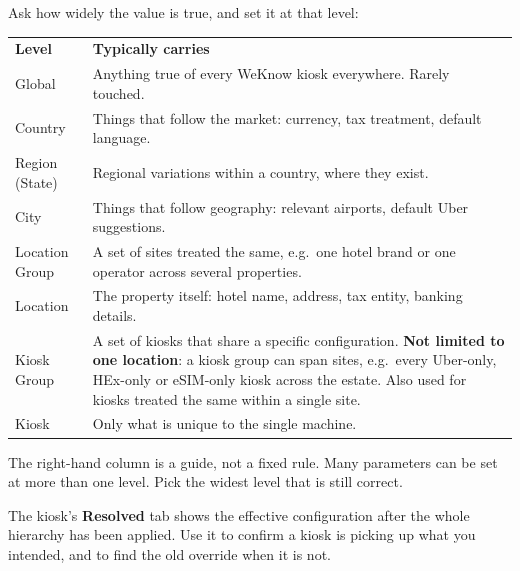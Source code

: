 \documentclass[a4paper,10pt]{article}
\begin{document}
Ask how widely the value is true, and set it at that level:

\begin{center}
\renewcommand{\arraystretch}{1.35}\small
\begin{tabularx}{\textwidth}{L{34mm} X}
\color{white}\textbf{Level} &
\color{white}\textbf{Typically carries}\\
Global &
Anything true of every WeKnow kiosk everywhere. Rarely touched.\\
Country &
Things that follow the market: currency, tax treatment, default
language.\\
Region (State) &
Regional variations within a country, where they exist.\\
City &
Things that follow geography: relevant airports, default Uber
suggestions.\\
Location Group &
A set of sites treated the same, e.g.\ one hotel brand or one operator
across several properties.\\
Location &
The property itself: hotel name, address, tax entity, banking details.\\
Kiosk Group &
A set of kiosks that share a specific configuration. \textbf{Not limited
to one location}: a kiosk group can span sites, e.g.\ every Uber-only,
HEx-only or eSIM-only kiosk across the estate. Also used for kiosks
treated the same within a single site.\\
Kiosk &
Only what is unique to the single machine.\\
\end{tabularx}
\end{center}

The right-hand column is a guide, not a fixed rule. Many parameters can be
set at more than one level. Pick the widest level that is still correct.

\begin{wkinfo}
The kiosk's \textbf{Resolved} tab shows the effective configuration after
the whole hierarchy has been applied. Use it to confirm a kiosk is picking
up what you intended, and to find the old override when it is not.
\end{wkinfo}

\label{sec:part1}
\end{document}
